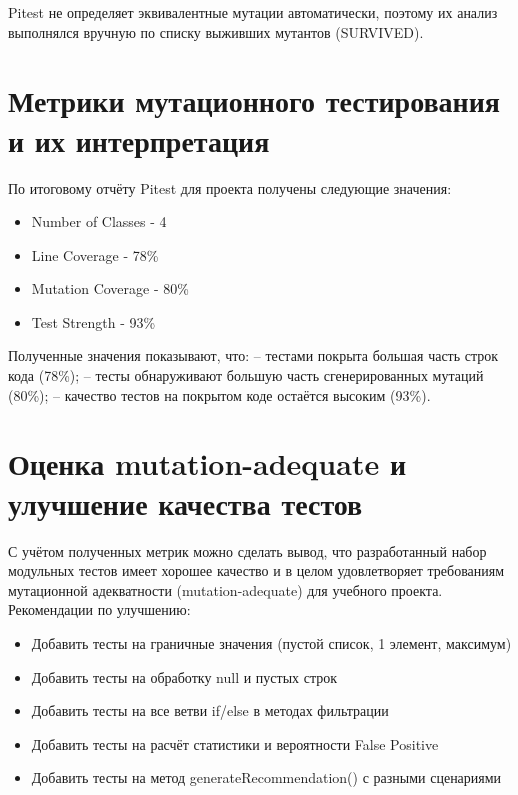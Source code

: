 Pitest не определяет эквивалентные мутации автоматически, поэтому их анализ выполнялся вручную по списку выживших мутантов (SURVIVED).

\section{Метрики мутационного тестирования и их интерпретация}\label{ch3:sec5}
По итоговому отчёту Pitest для проекта получены следующие значения:
\begin{itemize}
	\item Number of Classes - 4
	\item Line Coverage - 78\%
	\item Mutation Coverage - 80\%
	\item Test Strength - 93\%
\end{itemize}

Полученные значения показывают, что:
– тестами покрыта большая часть строк кода (78\%);
– тесты обнаруживают большую часть сгенерированных мутаций (80\%);
– качество тестов на покрытом коде остаётся высоким (93\%).

\section{Оценка mutation-adequate и улучшение качества тестов}\label{ch3:sec6}
С учётом полученных метрик можно сделать вывод, что разработанный набор модульных тестов имеет хорошее качество и в целом удовлетворяет требованиям мутационной адекватности (mutation-adequate) для учебного проекта.
Рекомендации по улучшению:
\begin{itemize}
	\item Добавить тесты на граничные значения (пустой список, 1 элемент, максимум)
	\item Добавить тесты на обработку null и пустых строк
	\item Добавить тесты на все ветви if/else в методах фильтрации
	\item Добавить тесты на расчёт статистики и вероятности False Positive
	\item Добавить тесты на метод generateRecommendation() с разными сценариями
\end{itemize}